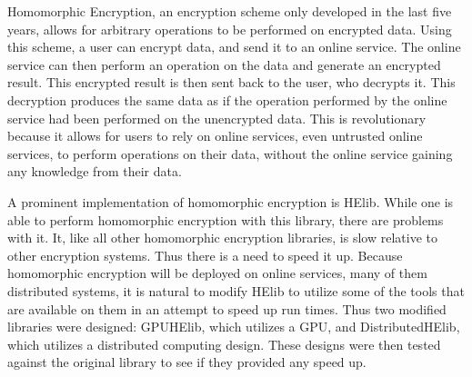 Homomorphic Encryption, an encryption scheme only developed in the last five years, allows for arbitrary operations to be performed on encrypted data. Using this scheme, a user can encrypt data, and send it to an online service. The online service can then perform an operation on the data and generate an encrypted result. This encrypted result is then sent back to the user, who decrypts it. This decryption produces the same data as if the operation performed by the online service had been performed on the unencrypted data. This is revolutionary because it allows for users to rely on online services, even untrusted online services, to perform operations on their data, without the online service gaining any knowledge from their data.

A prominent implementation of homomorphic encryption is HElib. While one is able to perform homomorphic encryption with this library, there are problems with it. It, like all other homomorphic encryption libraries, is slow relative to other encryption systems. Thus there is a need to speed it up. Because homomorphic encryption will be deployed on online services, many of them distributed systems, it is natural to modify HElib to utilize some of the tools that are available on them in an attempt to speed up run times. Thus two modified libraries were designed: GPUHElib, which utilizes a GPU, and DistributedHElib, which utilizes a distributed computing design. These designs were then tested against the original library to see if they provided any speed up.